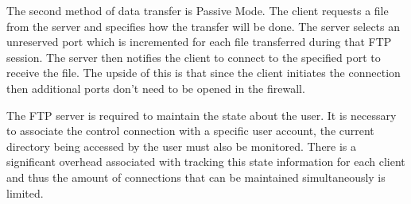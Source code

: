 The second method of data transfer is Passive Mode. The client requests a file from the server and specifies how the transfer will be done. The server selects an unreserved port
which is incremented for each file transferred during that FTP session. The server then notifies the client to connect to the specified port to receive the file. The
upside of this is that since the client initiates the connection then additional ports don't need to be opened in the firewall. \newpage

The FTP server is required to maintain the state about the user. It is necessary to associate the control connection with a specific user account, the current directory being accessed by
the user must also be monitored. There is a significant overhead associated with tracking this state information for each client and thus the amount of connections that can be maintained
simultaneously is limited.
